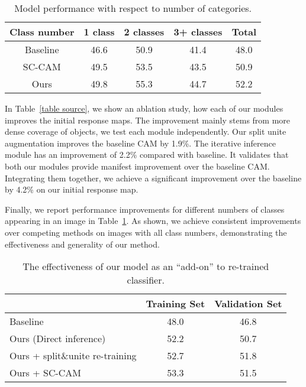 \documentclass[10pt,twocolumn,letterpaper]{article}
\begin{document}
\begin{table}[]
\centering
\footnotesize
\begin{tabular}{c|cccc}
\hline
     Class number & 1 class & 2 classes & 3+ classes & Total \\ \hline
Baseline &  46.6 & 50.9 & 41.4 & 48.0  \\ 
SC-CAM\cite{chang2020weakly} &  49.5 & 53.5 & 43.5 & 50.9 \\ 
Ours & 49.8 & 55.3 & 44.7 &52.2       \\ \hline
\end{tabular}
\caption{Model performance with respect to number of categories.
}
\vspace{-2mm}
\label{table per class cam}
\end{table}

In Table~\ref{table source}, we show an ablation study, how each of our modules improves the initial response maps.
The improvement mainly stems from more dense coverage of objects, we test each module independently. 
Our split  unite augmentation improves the baseline CAM by 1.9\%. 
The iterative inference module has an improvement of 2.2\% compared with baseline.
It validates that both our modules provide manifest improvement over the baseline CAM.  Integrating them together, we achieve a significant improvement over the baseline by 4.2\% on our initial response map.  

Finally, 
we report performance improvements for different numbers of classes appearing in an image in Table~\ref{table per class cam}.
As shown, we achieve consistent improvements over competing methods on images with all class numbers,  demonstrating the effectiveness and generality of our method. 






\begin{table}[]
\footnotesize
\centering
\begin{tabular}{l|c|c}
\hline
         & Training Set & Validation Set \\ \hline
Baseline & 48.0         & 46.8           \\
Ours (Direct inference)  & 52.2         & 50.7           \\
Ours + split\&unite re-training  & 52.7         & 51.8             \\
Ours + SC-CAM\cite{chang2020weakly}  & 53.3         & 51.5             \\
\hline
\end{tabular}
\caption{The effectiveness of our model as an \enquote{add-on} to
re-trained classifier.
}
\vspace{-5mm}
\label{table retrain}
\end{table}
\end{document}
